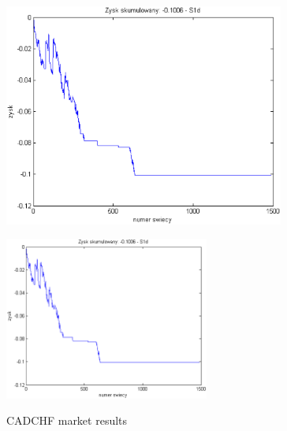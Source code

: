 \documentclass{tewiart}
\begin{document}
\begin{figure}[h]
\begin{minipage}{.49\linewidth}
\label{cztero}
\end{minipage}
\begin{minipage}{.49\linewidth}
\centering
\includegraphics[width=0.82\textwidth]{images/cadchfS1d.eps}
\label{mansard}
\end{minipage}
\begin{minipage}{\linewidth}
\centering
\includegraphics[width=0.6\textwidth]{images/cadchfS1s.eps}
\label{mansard}
\end{minipage}
\caption{CADCHF market results}
\end{figure}
\FloatBarrier
\end{document}
